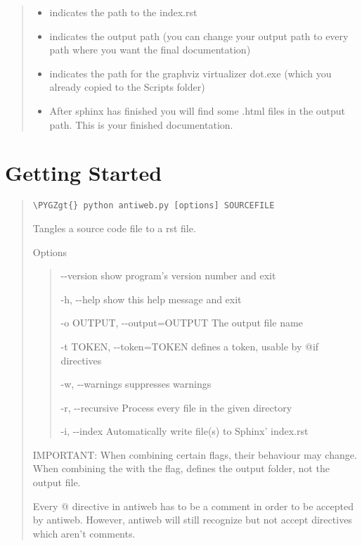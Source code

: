 \documentclass[letterpaper,10pt,english]{sphinxmanual}
\def\PYGZgt{\char`\>}
\begin{document}
\begin{quote}
\begin{itemize}
\item {} 
 indicates the path to the index.rst

\item {} 
 indicates the output path (you can change your output path to every path where you want the final documentation)

\item {} 
 indicates the path for the graphviz virtualizer dot.exe (which you already copied to the Scripts folder)

\item {} 
After sphinx has finished you will find some .html files in the output path. This is your finished documentation.

\end{itemize}
\end{quote}


\chapter{Getting Started}
\label{getting_started::doc}\label{getting_started:getting-started}\begin{quote}

\begin{Verbatim}[commandchars=\\\{\}]
\PYGZgt{} python antiweb.py [options] SOURCEFILE
\end{Verbatim}

Tangles a source code file to a rst file.

Options
\begin{quote}
\begin{optionlist}{3cm}
\item [-{-}version]  
show program's version number and exit
\item [-h, -{-}help]  
show this help message and exit
\item [-o OUTPUT, -{-}output=OUTPUT]  
The output file name
\item [-t TOKEN, -{-}token=TOKEN]  
defines a token, usable by @if directives
\item [-w, -{-}warnings]  
suppresses warnings
\item [-r, -{-}recursive]  
Process every file in the given directory
\item [-i, -{-}index]  
Automatically write file(s) to Sphinx' index.rst
\end{optionlist}
\end{quote}

IMPORTANT: When combining certain flags, their behaviour may change. When combining the  with the  flag,  defines the output folder, not the output file.

Every @ directive in antiweb has to be a comment in order to be accepted by antiweb. However, antiweb will still recognize but not accept directives which aren't comments.
\end{quote}
\end{document}
